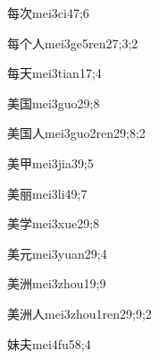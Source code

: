 \begin{verbete}{每次}{mei3ci4}{7;6}
\end{verbete}

\begin{verbete}{每个人}{mei3ge5ren2}{7;3;2}
\end{verbete}

\begin{verbete}{每天}{mei3tian1}{7;4}
\end{verbete}

\begin{verbete}{美国}{mei3guo2}{9;8}
\end{verbete}

\begin{verbete}{美国人}{mei3guo2ren2}{9;8;2}
\end{verbete}

\begin{verbete}{美甲}{mei3jia3}{9;5}
\end{verbete}

\begin{verbete}{美丽}{mei3li4}{9;7}
\end{verbete}

\begin{verbete}{美学}{mei3xue2}{9;8}
\end{verbete}

\begin{verbete}{美元}{mei3yuan2}{9;4}
\end{verbete}

\begin{verbete}{美洲}{mei3zhou1}{9;9}
\end{verbete}

\begin{verbete}{美洲人}{mei3zhou1ren2}{9;9;2}
\end{verbete}

\begin{verbete}{妹夫}{mei4fu5}{8;4}
\end{verbete}

